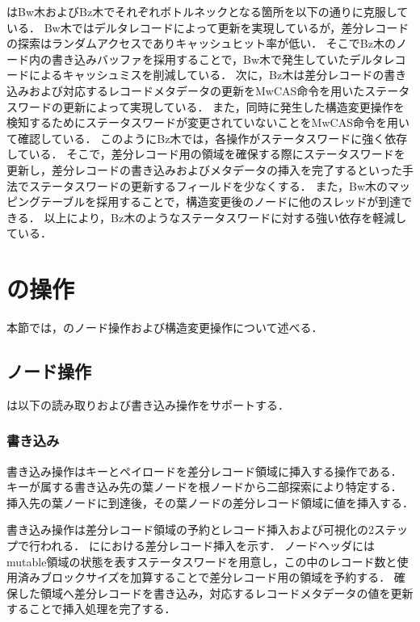 \Bctree{}はBw木およびBz木でそれぞれボトルネックとなる箇所を以下の通りに克服している．
Bw木ではデルタレコードによって更新を実現しているが，差分レコードの探索はランダムアクセスでありキャッシュヒット率が低い．
そこでBz木のノード内の書き込みバッファを採用することで，Bw木で発生していたデルタレコードによるキャッシュミスを削減している．
次に，Bz木は差分レコードの書き込みおよび対応するレコードメタデータの更新をMwCAS命令を用いたステータスワードの更新によって実現している．
また，同時に発生した構造変更操作を検知するためにステータスワードが変更されていないことをMwCAS命令を用いて確認している．
このようにBz木では，各操作がステータスワードに強く依存している．
そこで，差分レコード用の領域を確保する際にステータスワードを更新し，差分レコードの書き込みおよびメタデータの挿入を完了するといった手法でステータスワードの更新するフィールドを少なくする．
また，Bw木のマッピングテーブルを採用することで，構造変更後のノードに他のスレッドが到達できる．
以上により，Bz木のようなステータスワードに対する強い依存を軽減している．

\section{\Bctree{}の操作}
\label{sec:bc_tree_operation}

本節では，\Bctree{}のノード操作および構造変更操作について述べる．

\subsection{ノード操作}

\Bctree{}は以下の読み取りおよび書き込み操作をサポートする．

\subsubsection{書き込み}

書き込み操作はキーとペイロードを差分レコード領域に挿入する操作である．
キーが属する書き込み先の葉ノードを根ノードから二部探索により特定する．
挿入先の葉ノードに到達後，その葉ノードの差分レコード領域に値を挿入する．

書き込み操作は差分レコード領域の予約とレコード挿入および可視化の2ステップで行われる．
\Fig{\ref{fig:bc_tree_insertion}}に\Bctree{}における差分レコード挿入を示す．
ノードヘッダにはmutable領域の状態を表すステータスワードを用意し，この中のレコード数と使用済みブロックサイズを加算することで差分レコード用の領域を予約する．
確保した領域へ差分レコードを書き込み，対応するレコードメタデータの値を更新することで挿入処理を完了する．

